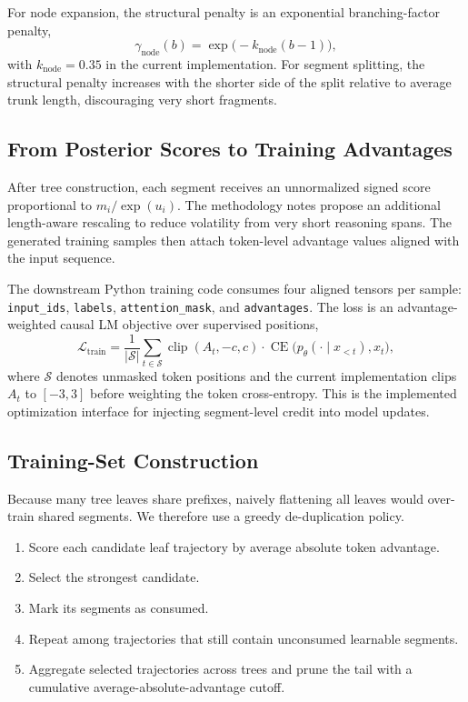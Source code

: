 \documentclass[letterpaper]{article} %
\begin{document}
For node expansion, the structural penalty is an exponential branching-factor penalty,
\begin{equation}
\gamma_{\text{node}}(b) = \exp\big(-k_{\text{node}}(b-1)\big),
\end{equation}
with $k_{\text{node}}=0.35$ in the current implementation.
For segment splitting, the structural penalty increases with the shorter side of the split relative to average trunk length, discouraging very short fragments.

\subsection{From Posterior Scores to Training Advantages}
After tree construction, each segment receives an unnormalized signed score proportional to $m_i / \exp(u_i)$. The methodology notes propose an additional length-aware rescaling to reduce volatility from very short reasoning spans. The generated training samples then attach token-level advantage values aligned with the input sequence.

The downstream Python training code consumes four aligned tensors per sample: \texttt{input\_ids}, \texttt{labels}, \texttt{attention\_mask}, and \texttt{advantages}. The loss is an advantage-weighted causal LM objective over supervised positions,
\begin{equation}
\mathcal{L}_{\text{train}} = \frac{1}{|\mathcal{S}|}
\sum_{t \in \mathcal{S}}
\operatorname{clip}(A_t,-c,c)
\cdot
\operatorname{CE}\big(p_\theta(\cdot \mid x_{<t}), x_t\big),
\end{equation}
where $\mathcal{S}$ denotes unmasked token positions and the current implementation clips $A_t$ to $[-3,3]$ before weighting the token cross-entropy. This is the implemented optimization interface for injecting segment-level credit into model updates.

\subsection{Training-Set Construction}
Because many tree leaves share prefixes, naively flattening all leaves would over-train shared segments. We therefore use a greedy de-duplication policy.
\begin{enumerate}
    \item Score each candidate leaf trajectory by average absolute token advantage.
    \item Select the strongest candidate.
    \item Mark its segments as consumed.
    \item Repeat among trajectories that still contain unconsumed learnable segments.
    \item Aggregate selected trajectories across trees and prune the tail with a cumulative average-absolute-advantage cutoff.
\end{enumerate}
\end{document}
